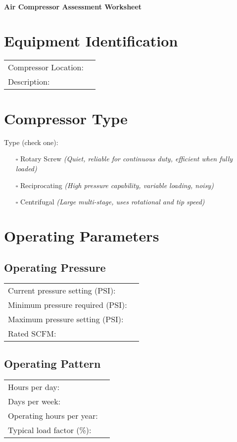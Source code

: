 \documentclass[./main.tex]{subfiles}
\begin{document}
\begin{center}
\Large\textbf{Air Compressor Assessment Worksheet}
\end{center}

\section*{Equipment Identification}
\noindent\begin{tabularx}{\textwidth}{@{}lX@{}}
Compressor Location: & \hrulefill \\[2ex]
Description: & \hrulefill \\[2ex]
\end{tabularx}

\section*{Compressor Type}
\noindent Type (check one):
\begin{itemize}[leftmargin=1cm]
\item[$\square$] Rotary Screw \hfill \textit{(Quiet, reliable for continuous duty, efficient when fully loaded)}
\item[$\square$] Reciprocating \hfill \textit{(High pressure capability, variable loading, noisy)}
\item[$\square$] Centrifugal \hfill \textit{(Large multi-stage, uses rotational and tip speed)}
\end{itemize}

\section*{Operating Parameters}
\subsection*{Operating Pressure}
\noindent\begin{tabularx}{\textwidth}{@{}lX@{}}
Current pressure setting (PSI): & \hrulefill \\[2ex]
Minimum pressure required (PSI): & \hrulefill \\[2ex]
Maximum pressure setting (PSI): & \hrulefill \\[2ex]
Rated SCFM: & \hrulefill \\[2ex]
\end{tabularx}

\subsection*{Operating Pattern}
\noindent\begin{tabularx}{\textwidth}{@{}lX@{}}
Hours per day: & \hrulefill \\[2ex]
Days per week: & \hrulefill \\[2ex]
Operating hours per year: & \hrulefill \\[2ex]
Typical load factor (\%): & \hrulefill \\[2ex]
\end{tabularx}
\end{document}
